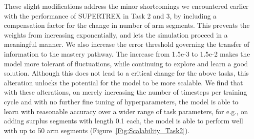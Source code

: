 These slight modifications address the minor shortcomings we encountered earlier with the performance of SUPERTREX in Task 2 and 3, by including a compensation factor for the change in number of arm segments. This prevents the weights from increasing exponentially, and lets the simulation proceed in a meaningful manner. We also increase the error threshold governing the transfer of information to the mastery pathway. The increase from 1.5e-3 to 1.5e-2 makes the model more tolerant of fluctuations, while continuing to explore and learn a good solution. Although this does not lead to a critical change for the above tasks, this alteration unlocks the potential for the model to be more scalable. We find that with these alterations, on merely increasing the number of timesteps per training cycle and with no further fine tuning of hyperparameters, the model is able to learn with reasonable accuracy over a wider range of task parameters, for e.g., on adding surplus segments with length 0.1 each, the model is able to perform well with up to 50 arm segments  (Figure~\ref{Fig:Scalability_Task2}).







